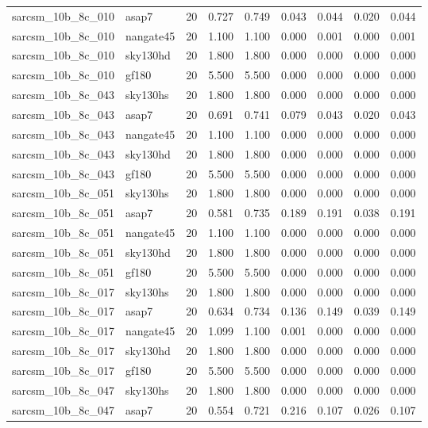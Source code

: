 \begin{tabular}{llrrrrrrr}
sarcsm\_10b\_8c\_010 & asap7 & 20 & 0.727 & 0.749 & 0.043 & 0.044 & 0.020 & 0.044 \\
sarcsm\_10b\_8c\_010 & nangate45 & 20 & 1.100 & 1.100 & 0.000 & 0.001 & 0.000 & 0.001 \\
sarcsm\_10b\_8c\_010 & sky130hd & 20 & 1.800 & 1.800 & 0.000 & 0.000 & 0.000 & 0.000 \\
sarcsm\_10b\_8c\_010 & gf180 & 20 & 5.500 & 5.500 & 0.000 & 0.000 & 0.000 & 0.000 \\
sarcsm\_10b\_8c\_043 & sky130hs & 20 & 1.800 & 1.800 & 0.000 & 0.000 & 0.000 & 0.000 \\
sarcsm\_10b\_8c\_043 & asap7 & 20 & 0.691 & 0.741 & 0.079 & 0.043 & 0.020 & 0.043 \\
sarcsm\_10b\_8c\_043 & nangate45 & 20 & 1.100 & 1.100 & 0.000 & 0.000 & 0.000 & 0.000 \\
sarcsm\_10b\_8c\_043 & sky130hd & 20 & 1.800 & 1.800 & 0.000 & 0.000 & 0.000 & 0.000 \\
sarcsm\_10b\_8c\_043 & gf180 & 20 & 5.500 & 5.500 & 0.000 & 0.000 & 0.000 & 0.000 \\
sarcsm\_10b\_8c\_051 & sky130hs & 20 & 1.800 & 1.800 & 0.000 & 0.000 & 0.000 & 0.000 \\
sarcsm\_10b\_8c\_051 & asap7 & 20 & 0.581 & 0.735 & 0.189 & 0.191 & 0.038 & 0.191 \\
sarcsm\_10b\_8c\_051 & nangate45 & 20 & 1.100 & 1.100 & 0.000 & 0.000 & 0.000 & 0.000 \\
sarcsm\_10b\_8c\_051 & sky130hd & 20 & 1.800 & 1.800 & 0.000 & 0.000 & 0.000 & 0.000 \\
sarcsm\_10b\_8c\_051 & gf180 & 20 & 5.500 & 5.500 & 0.000 & 0.000 & 0.000 & 0.000 \\
sarcsm\_10b\_8c\_017 & sky130hs & 20 & 1.800 & 1.800 & 0.000 & 0.000 & 0.000 & 0.000 \\
sarcsm\_10b\_8c\_017 & asap7 & 20 & 0.634 & 0.734 & 0.136 & 0.149 & 0.039 & 0.149 \\
sarcsm\_10b\_8c\_017 & nangate45 & 20 & 1.099 & 1.100 & 0.001 & 0.000 & 0.000 & 0.000 \\
sarcsm\_10b\_8c\_017 & sky130hd & 20 & 1.800 & 1.800 & 0.000 & 0.000 & 0.000 & 0.000 \\
sarcsm\_10b\_8c\_017 & gf180 & 20 & 5.500 & 5.500 & 0.000 & 0.000 & 0.000 & 0.000 \\
sarcsm\_10b\_8c\_047 & sky130hs & 20 & 1.800 & 1.800 & 0.000 & 0.000 & 0.000 & 0.000 \\
sarcsm\_10b\_8c\_047 & asap7 & 20 & 0.554 & 0.721 & 0.216 & 0.107 & 0.026 & 0.107 \\

\end{tabular}
